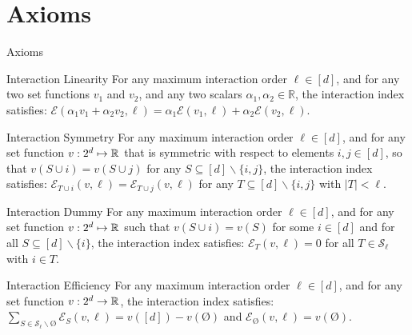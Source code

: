 \documentclass[10pt]{beamer}
\newcommand{\f}{v}
\newcommand{\ex}{\Expl}
\def\Expl{\mathcal{E}}
\begin{document}
\section[Axioms]{Axioms}

\begin{frame}{Axioms}
    \begin{myaxiombox}{Interaction Linearity}
    For any maximum interaction order $\ell \in [d]$, and for any two set functions $\f_1$ and $\f_2$, and any two scalars $\alpha_1, \alpha_2 \in \mathbb{R}$, the interaction index satisfies: $\ex(\alpha_1 \f_1+ \alpha_2 \f_2,\ell) = \alpha_1 \ex(\f_1,\ell) + \alpha_2 \ex(\f_2,\ell)$.
    \end{myaxiombox}
\end{frame}
\begin{frame}
    \begin{myaxiombox}{Interaction Symmetry}
        For any maximum interaction order $\ell \in [d]$, and for any set function $\f:2^d \mapsto \R$ that is symmetric with respect to elements $i, j \in [d]$, so that
$\f(S \! \cup  i) = \f(S \! \cup  j) \!$ for any $S \subseteq [d] \backslash \{i,j\}$, the interaction index satisfies: $\ex_{T \cup i}(\f,\ell) = \ex_{ T \cup j}(\f,\ell)$ for any $T \subseteq [d] \backslash \{i,j\}$ with $|T| < \ell$.
    \end{myaxiombox}

\end{frame}


\begin{frame}
    \begin{myaxiombox}{Interaction Dummy}
        For any maximum interaction order $\ell \in [d]$, and for any set function $\f:2^d \mapsto \R$ such that $\f(S \cup i) = \f(S)$ for some $i \in [d]$ and for all $ S \subseteq [d] \backslash \{i\}$, the interaction index satisfies:  $\ex_{T}(\f, \ell) = 0$ for all $T \in \mathcal{S}_\ell$ with $i \in T$.
    \end{myaxiombox}
\end{frame}
\begin{frame}
    \begin{myaxiombox}{Interaction Efficiency}
        For any maximum interaction order $\ell \in [d]$, and for any set function $\f:2^d \rightarrow \R$, the interaction index satisfies: $\sum_{S \in \mathcal{S}_\ell\backslash\text{\O}} \ex_S(\f,\ell) = \f([d]) - \f(\text{\O})$ and $\ex_{\text{\O}}(\f,\ell) = \f(\text{\O})$.
    \end{myaxiombox}
\end{frame}
\end{document}

